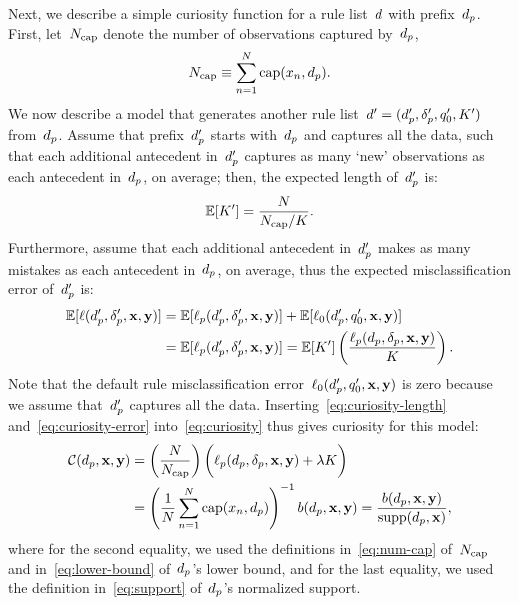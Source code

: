 Next, we describe a simple curiosity function for a rule list~${d}$ with prefix~$d_p$.
%
First, let~$N_{\textnormal{cap}}$ denote the number of observations captured by~$d_p$, \ie
\begin{align}
N_{\textnormal{cap}} \equiv \sum_{n=1}^N \textnormal{cap}(x_n, d_p).
\label{eq:num-cap}
\end{align}
We now describe a model that generates another
rule list~${{d}' = (d_p', \delta_p', q_0', K')}$ from~$d_p$.
%
Assume that prefix~$d_p'$ starts with~$d_p$ and captures all the data,
such that each additional antecedent in~$d_p'$
captures as many `new' observations as each antecedent in~$d_p$, on average;
then, the expected length of~$d_p'$ is:
\begin{align}
\mathbb{E}[ K' ] = \frac{N}{N_{\textnormal{cap}} / K}.
\label{eq:curiosity-length}
\end{align}
Furthermore, assume that each additional antecedent in~$d_p'$
makes as many mistakes as each antecedent in~$d_p$, on average,
thus the expected misclassification error of~$d_p'$ is:
\begin{align}
\mathbb{E}[\ell(d_p', \delta_p', \mathbf{x}, \mathbf{y})]
&= \mathbb{E}[\ell_p(d_p', \delta_p', \mathbf{x}, \mathbf{y})] + \mathbb{E}[\ell_0(d_p', q_0', \mathbf{x}, \mathbf{y})] \nonumber \\
&= \mathbb{E}[\ell_p(d_p', \delta_p', \mathbf{x}, \mathbf{y})]
=  \mathbb{E}[ K' ] \left(\frac{\ell_p(d_p, \delta_p, \mathbf{x}, \mathbf{y})}{K}\right).
\label{eq:curiosity-error}
\end{align}
Note that the default rule misclassification error~$\ell_0(d_p', q_0', \mathbf{x}, \mathbf{y})$
is zero because we assume that~$d_p'$ captures all the data.
%
Inserting~\eqref{eq:curiosity-length} and~\eqref{eq:curiosity-error}
into~\eqref{eq:curiosity} thus gives curiosity for this model:
\begin{align*}
\mathcal{C}(d_p, \mathbf{x}, \mathbf{y})
&= \left( \frac{N}{N_{\textnormal{cap}}} \right) \biggl(\ell_p(d_p, \delta_p, \mathbf{x}, \mathbf{y}) + {\lambda} K \biggr) \\
&= \left( \frac{1}{N} \sum_{n=1}^N \textnormal{cap}(x_n, d_p) \right)^{-1} b(d_p, \mathbf{x}, \mathbf{y})
= \frac{b(d_p, \mathbf{x}, \mathbf{y})}{\textnormal{supp}(d_p, \mathbf{x})},
\end{align*}
where for the second equality, we used the definitions in~\eqref{eq:num-cap} of~$N_{\textnormal{cap}}$
and in~\eqref{eq:lower-bound} of~$d_p$'s lower bound, and for the last equality,
we used the definition in~\eqref{eq:support} of~$d_p$'s normalized support.

